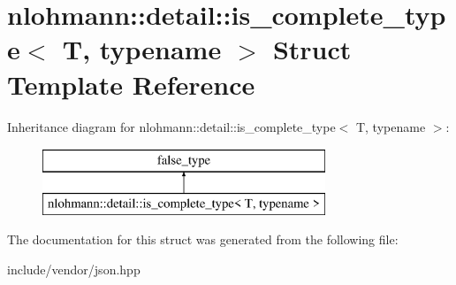 \hypertarget{structnlohmann_1_1detail_1_1is__complete__type}{}\section{nlohmann\+:\+:detail\+:\+:is\+\_\+complete\+\_\+type$<$ T, typename $>$ Struct Template Reference}
\label{structnlohmann_1_1detail_1_1is__complete__type}
Inheritance diagram for nlohmann\+:\+:detail\+:\+:is\+\_\+complete\+\_\+type$<$ T, typename $>$\+:\begin{figure}[H]
\begin{center}
\leavevmode
\includegraphics[height=2.000000cm]{d2/db3/structnlohmann_1_1detail_1_1is__complete__type}
\end{center}
\end{figure}


The documentation for this struct was generated from the following file\+:\begin{DoxyCompactItemize}
\item 
include/vendor/json.\+hpp\end{DoxyCompactItemize}

